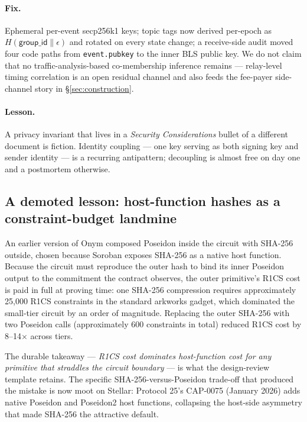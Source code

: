\documentclass[11pt,a4paper]{article}
\begin{document}
\paragraph{Fix.}
Ephemeral per-event secp256k1 keys; topic tags now derived per-epoch as $H(\mathsf{group\_id} \mathbin\| \epsilon)$ and rotated on every state change; a receive-side audit moved four code paths from \texttt{event.pubkey} to the inner BLS public key. We do not claim that no traffic-analysis-based co-membership inference remains --- relay-level timing correlation is an open residual channel and also feeds the fee-payer side-channel story in \S\ref{sec:construction}.

\paragraph{Lesson.}
A privacy invariant that lives in a \emph{Security Considerations} bullet of a different document is fiction. Identity coupling --- one key serving as both signing key and sender identity --- is a recurring antipattern; decoupling is almost free on day one and a postmortem otherwise.

\subsection{A demoted lesson: host-function hashes as a constraint-budget landmine}
\label{sec:p3demoted}

An earlier version of Onym composed Poseidon inside the circuit with SHA-256 outside, chosen because Soroban exposes SHA-256 as a native host function. Because the circuit must reproduce the outer hash to bind its inner Poseidon output to the commitment the contract observes, the outer primitive's R1CS cost is paid in full at proving time: one SHA-256 compression requires approximately 25{,}000 R1CS constraints in the standard arkworks gadget, which dominated the small-tier circuit by an order of magnitude. Replacing the outer SHA-256 with two Poseidon calls (approximately 600 constraints in total) reduced R1CS cost by 8--14$\times$ across tiers.

The durable takeaway --- \emph{R1CS cost dominates host-function cost for any primitive that straddles the circuit boundary} --- is what the design-review template retains. The specific SHA-256-versus-Poseidon trade-off that produced the mistake is now moot on Stellar: Protocol 25's CAP-0075 (January 2026) adds native Poseidon and Poseidon2 host functions, collapsing the host-side asymmetry that made SHA-256 the attractive default.
\end{document}
